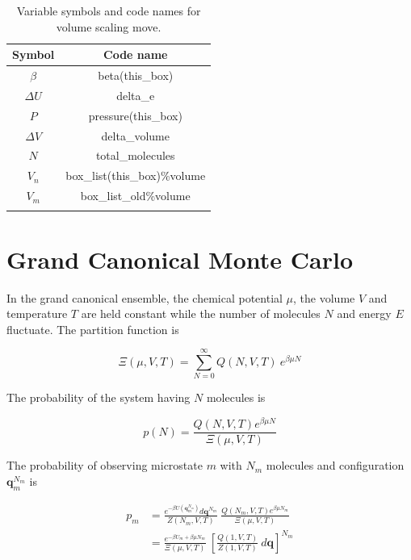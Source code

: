 \begin{table}
\caption{Variable symbols and code names for volume scaling move.}
\label{table:volume}
\centering
\begin{tabular}{|c|c|} \hline
 {\bf Symbol} & {\bf Code name} \\ \hline
 $\beta$ & beta(this\_box) \\
 $\Delta U$ & delta\_e \\
 $P$ & pressure(this\_box) \\
 $\Delta V$ & delta\_volume \\
 $N$ & total\_molecules \\
 $V_n$ & box\_list(this\_box)\%volume \\
 $V_m$ & box\_list\_old\%volume \\
 \hline
\multicolumn{2}{c}{}
\end{tabular}
\end{table}


\section{Grand Canonical Monte Carlo}
\label{sec:MuVT}
In the grand canonical ensemble, the chemical potential $\mu$, the volume $V$ and temperature $T$ are held constant while the number of molecules $N$ and energy $E$ fluctuate. The partition function is 

\begin{equation}
\label{eq:partitionFn_MuVT}
\Xi(\mu,V,T) = \sum\limits_{N=0}^{\infty} Q(N,V,T)\ e^{\beta \mu N}
\end{equation}

The probability of the system having $N$ molecules is 

\begin{equation}
\label{eq:pN}
p(N) = \frac{Q(N,V,T)e^{\beta \mu N}}{\Xi(\mu,V,T)}
\end{equation}

The probability of observing microstate $m$ with $N_m$ molecules and configuration $\mathbf{q}_m^{N_m}$ is

\begin{align}
\label{eq:pMuVT}
p_m &= \frac{e^{-\beta U(\mathbf{q}_m^{N_m})} d\mathbf{q}^{N_m}}{Z(N_m,V,T)}\ \frac{Q(N_m,V,T)e^{\beta \mu N_m}}{\Xi(\mu,V,T)} \nonumber \\
&= \frac{e^{-\beta U_m + \beta \mu N_m}}{\Xi(\mu,V,T)}\ \left[\frac{Q(1,V,T)}{Z(1,V,T)}\ d\mathbf{q}\right]^{N_m}
\end{align}

